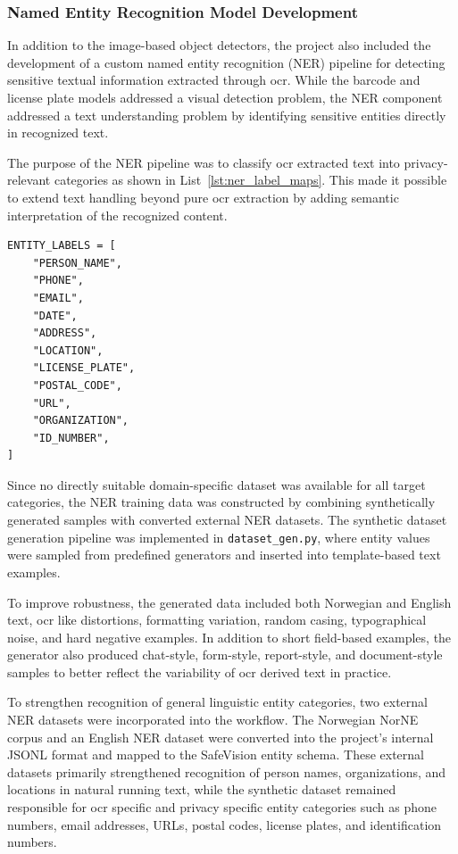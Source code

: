 \subsubsection{Named Entity Recognition Model Development}

In addition to the image-based object detectors, the project also included the development of a custom named entity recognition (NER) pipeline for detecting sensitive textual information extracted through \acrshort{ocr}. While the \gls{barcode} and license plate models addressed a visual detection problem, the NER component addressed a text understanding problem by identifying sensitive entities directly in recognized text.

The purpose of the NER pipeline was to classify \acrshort{ocr} extracted text into privacy-relevant categories as shown in List~\ref{lst:ner_label_maps}. This made it possible to extend text handling beyond pure \acrshort{ocr} extraction by adding semantic interpretation of the recognized content.

\begin{lstlisting}[caption={BIO label construction for NER training}, label={lst:ner_label_maps}]
ENTITY_LABELS = [
    "PERSON_NAME",
    "PHONE",
    "EMAIL",
    "DATE",
    "ADDRESS",
    "LOCATION",
    "LICENSE_PLATE",
    "POSTAL_CODE",
    "URL",
    "ORGANIZATION",
    "ID_NUMBER",
]
\end{lstlisting}


Since no directly suitable domain-specific dataset was available for all target categories, the NER training data was constructed by combining synthetically generated samples with converted external NER datasets. The synthetic dataset generation pipeline was implemented in \texttt{dataset\_gen.py}, where entity values were sampled from predefined generators and inserted into template-based text examples.

To improve robustness, the generated data included both Norwegian and English text, \acrshort{ocr} like distortions, formatting variation, random casing, typographical noise, and hard negative examples. In addition to short field-based examples, the generator also produced chat-style, form-style, report-style, and document-style samples to better reflect the variability of \acrshort{ocr} derived text in practice.

To strengthen recognition of general linguistic entity categories, two external NER datasets were incorporated into the workflow. The Norwegian NorNE corpus and an English NER dataset were converted into the project’s internal JSONL format and mapped to the \gls{SafeVision} entity schema. These external datasets primarily strengthened recognition of person names, organizations, and locations in natural running text, while the synthetic dataset remained responsible for \acrshort{ocr} specific and privacy specific entity categories such as phone numbers, email addresses, URLs, postal codes, license plates, and identification numbers.

